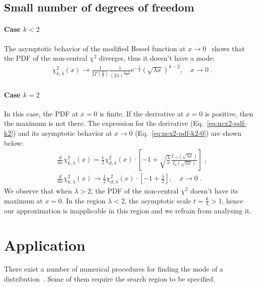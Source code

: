 \documentclass[final,5p,twocolumn,preprint,nopreprintline,times,authoryear]{elsarticle}
\begin{document}
\subsection{Small number of degrees of freedom}\label{subsec:edge-cases}
%
\paragraph{Case $k < 2$}
The asymptotic behavior of the modified Bessel function at $x \rightarrow 0$~\cite[Eq.~10.30.1]{NIST:DLMF} shows that the PDF of the non-central $\chi^2$ diverges, thus it doesn't have a mode:
%
\begin{align}
 &\chi^2_{k, \lambda}(x) \rightarrow \frac{1}{2\Gamma(\frac{k}{2})} \frac{1}{(2 \lambda)^{\frac{k - 2}{2}}} \mathrm{e}^{-\frac{\lambda}{2}} \left(\sqrt{\lambda x}\right)^{k-2}, \quad x \rightarrow 0\;.
\end{align}
%
\paragraph{Case $k = 2$}
In this case, the PDF at $x=0$ is finite. If the derivative at $x=0$ is positive, then the maximum is not there. The expression for the derivative (Eq.~\ref{eq:ncx2-pdf-k2}) and its asymptotic behavior at $x \rightarrow 0$ (Eq.~\ref{eq:ncx2-pdf-k2-0}) are shown below:
%
\begin{align}
 &\frac{d}{dx} \chi^2_{k, \lambda}(x) = \frac{1}{2} \chi^2_{d, \lambda}(x) \cdot \left[ -1 +  \sqrt{\frac{\lambda}{x}}\frac{I_{-1}(\sqrt{\lambda x})}{I_{0}(\sqrt{\lambda x})} \right]\label{eq:ncx2-pdf-k2}\;, \\
 &\frac{d}{dx} \chi^2_{k, \lambda}(x) \rightarrow \frac{1}{2} \chi^2_{d, \lambda}(x) \cdot \left[ -1 + \frac{\lambda}{2} \right], \quad x \rightarrow 0\label{eq:ncx2-pdf-k2-0}\;.
\end{align}
%
We observe that when $\lambda > 2$, the PDF of the non-central $\chi^2$ doesn't have its maximum at $x = 0$. In the region $\lambda < 2$, the asymptotic scale $t = \frac{k}{\lambda} > 1$, hence our approximation is inapplicable in this region and we refrain from analysing it.

\section{Application}
There exist a number of numerical procedures for finding the mode of a distribution~\cite[Ch.~10]{NR}. Some of them require the search region to be specified.
\end{document}
